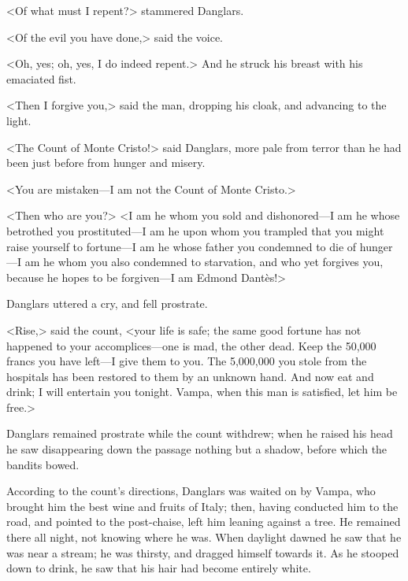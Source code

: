  <Of what must I repent?> stammered Danglars. 

 <Of the evil you have done,> said the voice. 

 <Oh, yes; oh, yes, I do indeed repent.> And he struck his breast with his emaciated fist. 

 <Then I forgive you,> said the man, dropping his cloak, and advancing to the light. 

 <The Count of Monte Cristo!> said Danglars, more pale from terror than he had been just before from hunger and misery. 

 <You are mistaken—I am not the Count of Monte Cristo.> 

 <Then who are you?>  <I am he whom you sold and dishonored—I am he whose betrothed you prostituted—I am he upon whom you trampled that you might raise yourself to fortune—I am he whose father you condemned to die of hunger—I am he whom you also condemned to starvation, and who yet forgives you, because he hopes to be forgiven—I am Edmond Dantès!> 

 Danglars uttered a cry, and fell prostrate. 

 <Rise,> said the count, <your life is safe; the same good fortune has not happened to your accomplices—one is mad, the other dead. Keep the 50,000 francs you have left—I give them to you. The 5,000,000 you stole from the hospitals has been restored to them by an unknown hand. And now eat and drink; I will entertain you tonight. Vampa, when this man is satisfied, let him be free.> 

 Danglars remained prostrate while the count withdrew; when he raised his head he saw disappearing down the passage nothing but a shadow, before which the bandits bowed. 

 According to the count's directions, Danglars was waited on by Vampa, who brought him the best wine and fruits of Italy; then, having conducted him to the road, and pointed to the post-chaise, left him leaning against a tree. He remained there all night, not knowing where he was. When daylight dawned he saw that he was near a stream; he was thirsty, and dragged himself towards it. As he stooped down to drink, he saw that his hair had become entirely white. 